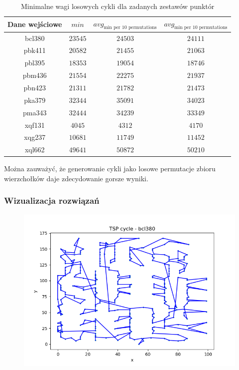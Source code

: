\documentclass[12pt]{article}
\begin{document}
    \begin{table}[h!]
        \centering
        \begin{tabularx}{0.81\textwidth}{| c | c | c | c |}
            \hline
            Dane wejściowe & $min$ & $avg_{\text{min per 10 permutations}}$ & $avg_{\text{min per 10 permutations}}$ \\
            \hline
            bcl380 & $23545$ & $24503$ & $24111$ \\
            pbk411 & $20582$ & $21455$ & $21063$ \\
            pbl395 & $18353$ & $19054$ & $18746$ \\
            pbm436 & $21554$ & $22275$ & $21937$ \\
            pbn423 & $21311$ & $21782$ & $21473$ \\
            pka379 & $32344$ & $35091$ & $34023$ \\
            pma343 & $32444$ & $34239$ & $33349$ \\
            xqf131 & $4045$ & $4312$ & $4170$ \\
            xqg237 & $10681$ & $11749$ & $11452$ \\
            xql662 & $49641$ & $50872$ & $50210$ \\
            \hline
        \end{tabularx}
        \caption{Minimalne wagi losowych cykli dla zadanych zestawów punktór}
        \label{table:min_weights}
    \end{table}

    \newpage
    \noindent Można zauważyć, że generowanie cykli jako losowe permutacje zbioru wierzchołków daje
              zdecydowanie gorsze wyniki.

    \noindent \newline


\subsubsection*{Wizualizacja rozwiązań}

\begin{figure}[h]
    \centering
    \includegraphics[width=0.8\linewidth]{img/bcl380.png}
    \label{fig:bcl380}
\end{figure}
\end{document}
